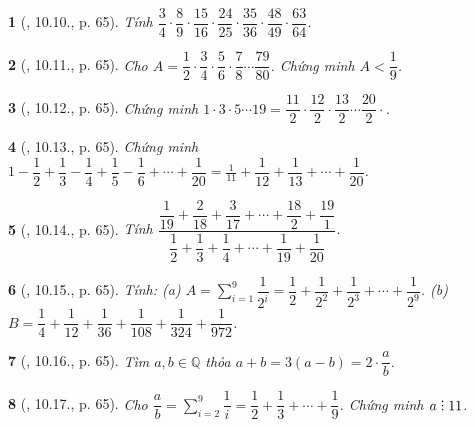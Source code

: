 \documentclass{article}
\newtheorem{baitoan}{}
\DeclareRobustCommand{\divby}{%
	\mathrel{\vbox{\baselineskip.65ex\lineskiplimit0pt\hbox{.}\hbox{.}\hbox{.}}}%
}
\begin{document}
\begin{baitoan}[\cite{TLCT_THCS_Toan_6_so_hoc}, 10.10., p. 65]
	Tính $\dfrac{3}{4}\cdot\dfrac{8}{9}\cdot\dfrac{15}{16}\cdot\dfrac{24}{25}\cdot\dfrac{35}{36}\cdot\dfrac{48}{49}\cdot\dfrac{63}{64}$.
\end{baitoan}

\begin{baitoan}[\cite{TLCT_THCS_Toan_6_so_hoc}, 10.11., p. 65]
	Cho $A = \dfrac{1}{2}\cdot\dfrac{3}{4}\cdot\dfrac{5}{6}\cdot\dfrac{7}{8}\cdots\dfrac{79}{80}$. Chứng minh $A < \dfrac{1}{9}$.
\end{baitoan}

\begin{baitoan}[\cite{TLCT_THCS_Toan_6_so_hoc}, 10.12., p. 65]
	Chứng minh $1\cdot3\cdot5\cdots19 = \dfrac{11}{2}\cdot\dfrac{12}{2}\cdot\dfrac{13}{2}\cdots\dfrac{20}{2}\cdot$.
\end{baitoan}

\begin{baitoan}[\cite{TLCT_THCS_Toan_6_so_hoc}, 10.13., p. 65]
	Chứng minh $1 - \dfrac{1}{2} + \dfrac{1}{3} - \dfrac{1}{4} + \dfrac{1}{5} - \dfrac{1}{6} + \cdots + \dfrac{1}{20} = \frac{1}{11} + \dfrac{1}{12} + \dfrac{1}{13} + \cdots + \dfrac{1}{20}$.
\end{baitoan}

\begin{baitoan}[\cite{TLCT_THCS_Toan_6_so_hoc}, 10.14., p. 65]
	Tính $\dfrac{\dfrac{1}{19} + \dfrac{2}{18} + \dfrac{3}{17} + \cdots + \dfrac{18}{2} + \dfrac{19}{1}}{\dfrac{1}{2} + \dfrac{1}{3} + \dfrac{1}{4} + \cdots + \dfrac{1}{19} + \dfrac{1}{20}}$.
\end{baitoan}

\begin{baitoan}[\cite{TLCT_THCS_Toan_6_so_hoc}, 10.15., p. 65]
	Tính: (a) $A = \sum_{i=1}^9 \dfrac{1}{2^i} = \dfrac{1}{2} + \dfrac{1}{2^2} + \dfrac{1}{2^3} + \cdots + \dfrac{1}{2^9}$. (b) $B = \dfrac{1}{4} + \dfrac{1}{12} + \dfrac{1}{36} + \dfrac{1}{108} + \dfrac{1}{324} + \dfrac{1}{972}$.
\end{baitoan}

\begin{baitoan}[\cite{TLCT_THCS_Toan_6_so_hoc}, 10.16., p. 65]
	Tìm $a,b\in\mathbb{Q}$ thỏa $a + b = 3(a - b) = 2\cdot\dfrac{a}{b}$.
\end{baitoan}

\begin{baitoan}[\cite{TLCT_THCS_Toan_6_so_hoc}, 10.17., p. 65]
	Cho $\dfrac{a}{b} = \sum_{i=2}^9 \dfrac{1}{i} = \dfrac{1}{2} + \dfrac{1}{3} + \cdots + \dfrac{1}{9}$. Chứng minh $a\divby11$.
\end{baitoan}
\end{document}
